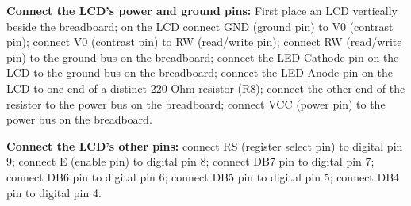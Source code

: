 \documentclass[a4paper]{article}
\begin{document}
\noindent \textbf{Connect the LCD’s power and ground pins:} First place an LCD vertically beside the breadboard; on the LCD connect GND (ground pin) to V0 (contrast pin); connect V0 (contrast pin) to RW (read/write pin); connect RW (read/write pin) to the ground bus on the breadboard; connect the LED Cathode pin on the LCD to the ground bus on the breadboard; connect the LED Anode pin on the LCD to one end of a distinct 220 Ohm resistor (R8); connect the other end of the resistor to the power bus on the breadboard; connect VCC (power pin) to the power bus on the breadboard.

\noindent \textbf{Connect the LCD’s other pins:} connect RS (register select pin) to digital pin 9; connect E (enable pin) to digital pin 8; connect DB7 pin to digital pin 7; connect DB6 pin to digital pin 6; connect DB5 pin to digital pin 5; connect DB4 pin to digital pin 4.
\end{document}
